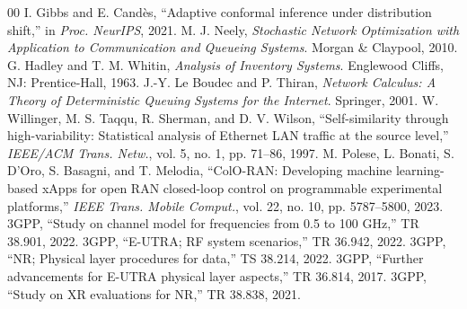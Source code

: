 \documentclass[conference]{IEEEtran}
\begin{document}
\begin{thebibliography}{00}
 I. Gibbs and E. Cand\`es, ``Adaptive conformal inference under distribution shift,'' in \emph{Proc. NeurIPS}, 2021.
 M. J. Neely, \emph{Stochastic Network Optimization with Application to Communication and Queueing Systems}. Morgan \& Claypool, 2010.
 G. Hadley and T. M. Whitin, \emph{Analysis of Inventory Systems}. Englewood Cliffs, NJ: Prentice-Hall, 1963.
 J.-Y. Le Boudec and P. Thiran, \emph{Network Calculus: A Theory of Deterministic Queuing Systems for the Internet}. Springer, 2001.
 W. Willinger, M. S. Taqqu, R. Sherman, and D. V. Wilson, ``Self-similarity through high-variability: Statistical analysis of Ethernet LAN traffic at the source level,'' \emph{IEEE/ACM Trans. Netw.}, vol. 5, no. 1, pp. 71--86, 1997.
 M. Polese, L. Bonati, S. D'Oro, S. Basagni, and T. Melodia, ``ColO-RAN: Developing machine learning-based xApps for open RAN closed-loop control on programmable experimental platforms,'' \emph{IEEE Trans. Mobile Comput.}, vol. 22, no. 10, pp. 5787--5800, 2023.
 3GPP, ``Study on channel model for frequencies from 0.5 to 100 GHz,'' TR 38.901, 2022.
 3GPP, ``E-UTRA; RF system scenarios,'' TR 36.942, 2022.
 3GPP, ``NR; Physical layer procedures for data,'' TS 38.214, 2022.
 3GPP, ``Further advancements for E-UTRA physical layer aspects,'' TR 36.814, 2017.
 3GPP, ``Study on XR evaluations for NR,'' TR 38.838, 2021.
\end{thebibliography}
\end{document}
